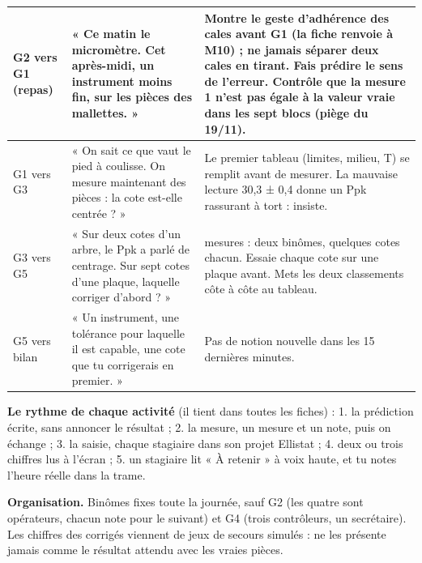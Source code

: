 \documentclass[10pt,a4paper]{article}
\begin{document}
\begin{tabularx}{\linewidth}{|>{\bfseries\raggedright\arraybackslash}p{19mm}|>{\raggedright\arraybackslash}p{56mm}|>{\raggedright\arraybackslash}X|}
G2 vers G1 (repas) & « Ce matin le micromètre. Cet après-midi, un instrument moins fin, sur les pièces des mallettes. » & Montre le geste d'adhérence des cales avant G1 (la fiche renvoie à M10) ; ne jamais séparer deux cales en tirant. Fais prédire le sens de l'erreur. Contrôle que la mesure 1 n'est pas égale à la valeur vraie dans les sept blocs (piège du 19/11).\\ \hline
G1 vers G3 & « On sait ce que vaut le pied à coulisse. On mesure maintenant des pièces : la cote est-elle centrée ? » & Le premier tableau (limites, milieu, T) se remplit avant de mesurer. La mauvaise lecture 30,3 ± 0,4 donne un Ppk rassurant à tort : insiste.\\ \hline
G3 vers G5 & « Sur deux cotes d'un arbre, le Ppk a parlé de centrage. Sur sept cotes d'une plaque, laquelle corriger d'abord ? » & 140 mesures : deux binômes, quelques cotes chacun. Essaie chaque cote sur une plaque avant. Mets les deux classements côte à côte au tableau.\\ \hline
G5 vers bilan & « Un instrument, une tolérance pour laquelle il est capable, une cote que tu corrigerais en premier. » & Pas de notion nouvelle dans les 15 dernières minutes.\\ \hline
\end{tabularx}
\par\smallskip
\normalsize
\textbf{Le rythme de chaque activité} (il tient dans toutes les fiches) : 1. la prédiction écrite, sans annoncer le résultat ; 2. la mesure, un mesure et un note, puis on échange ; 3. la saisie, chaque stagiaire dans son projet Ellistat ; 4. deux ou trois chiffres lus à l'écran ; 5. un stagiaire lit « À retenir » à voix haute, et tu notes l'heure réelle dans la trame.

\textbf{Organisation.} Binômes fixes toute la journée, sauf G2 (les quatre sont opérateurs, chacun note pour le suivant) et G4 (trois contrôleurs, un secrétaire). Les chiffres des corrigés viennent de jeux de secours simulés : ne les présente jamais comme le résultat attendu avec les vraies pièces.
\end{document}
